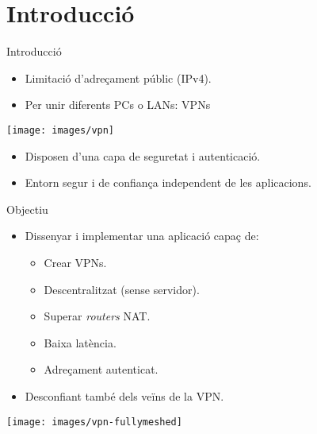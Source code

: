 \section{Introducció}
    \begin{frame}{Introducció}
        \begin{itemize}
\item Limitació d'adreçament públic (IPv4).
\item Per unir diferents PCs o LANs: VPNs
        \end{itemize}
        \begin{center}
        \texttt{[image: images/vpn]}
        \end{center}
        \begin{itemize}
\item Disposen d'una capa de seguretat i autenticació.
\item Entorn segur i de confiança independent de les aplicacions.
        \end{itemize}
    \end{frame}
    \begin{frame}{Objectiu}
        \begin{itemize}
\item Dissenyar i implementar una aplicació capaç de:
            \begin{itemize}
\item Crear VPNs.
\item Descentralitzat (sense servidor).
\item Superar \emph{routers} NAT.
\item Baixa latència.
\item Adreçament autenticat.
            \end{itemize}
\item Desconfiant també dels veïns de la VPN.
        \end{itemize}
        \begin{center}
        \texttt{[image: images/vpn-fullymeshed]}
        \end{center}
    \end{frame}
